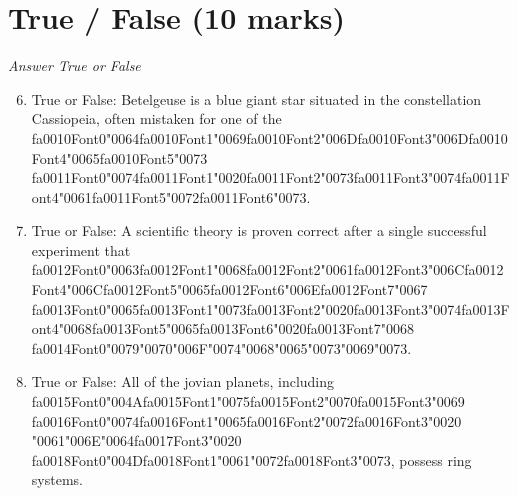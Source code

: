 \documentclass[12pt]{article}
\begin{document}
\section*{True / False (10 marks)}
\textit{Answer True or False}
\begin{enumerate}[label=\arabic*.]
\setcounter{enumi}{5}
\item True or False: Betelgeuse is a blue giant star situated in the constellation Cassiopeia, often mistaken for one of the {\csname fa0010Font0\endcsname\char"0064}{\csname fa0010Font1\endcsname\char"0069}{\csname fa0010Font2\endcsname\char"006D}{\csname fa0010Font3\endcsname\char"006D}{\csname fa0010Font4\endcsname\char"0065}{\csname fa0010Font5\endcsname\char"0073} {\csname fa0011Font0\endcsname\char"0074}{\csname fa0011Font1\endcsname\char"0020}{\csname fa0011Font2\endcsname\char"0073}{\csname fa0011Font3\endcsname\char"0074}{\csname fa0011Font4\endcsname\char"0061}{\csname fa0011Font5\endcsname\char"0072}{\csname fa0011Font6\endcsname\char"0073}.
\item True or False: A scientific theory is proven correct after a single successful experiment that {\csname fa0012Font0\endcsname\char"0063}{\csname fa0012Font1\endcsname\char"0068}{\csname fa0012Font2\endcsname\char"0061}{\csname fa0012Font3\endcsname\char"006C}{\csname fa0012Font4\endcsname\char"006C}{\csname fa0012Font5\endcsname\char"0065}{\csname fa0012Font6\endcsname\char"006E}{\csname fa0012Font7\endcsname\char"0067} {\csname fa0013Font0\endcsname\char"0065}{\csname fa0013Font1\endcsname\char"0073}{\csname fa0013Font2\endcsname\char"0020}{\csname fa0013Font3\endcsname\char"0074}{\csname fa0013Font4\endcsname\char"0068}{\csname fa0013Font5\endcsname\char"0065}{\csname fa0013Font6\endcsname\char"0020}{\csname fa0013Font7\endcsname\char"0068} {\csname fa0014Font0\endcsname\char"0079}{\char"0070}{\char"006F}{\char"0074}{\char"0068}{\char"0065}{\char"0073}{\char"0069}{\char"0073}.
\item True or False: All of the jovian planets, including {\csname fa0015Font0\endcsname\char"004A}{\csname fa0015Font1\endcsname\char"0075}{\csname fa0015Font2\endcsname\char"0070}{\csname fa0015Font3\endcsname\char"0069} {\csname fa0016Font0\endcsname\char"0074}{\csname fa0016Font1\endcsname\char"0065}{\csname fa0016Font2\endcsname\char"0072}{\csname fa0016Font3\endcsname\char"0020} {\char"0061}{\char"006E}{\char"0064}{\csname fa0017Font3\endcsname\char"0020} {\csname fa0018Font0\endcsname\char"004D}{\csname fa0018Font1\endcsname\char"0061}{\char"0072}{\csname fa0018Font3\endcsname\char"0073}, possess ring systems.

\end{enumerate}
\end{document}
